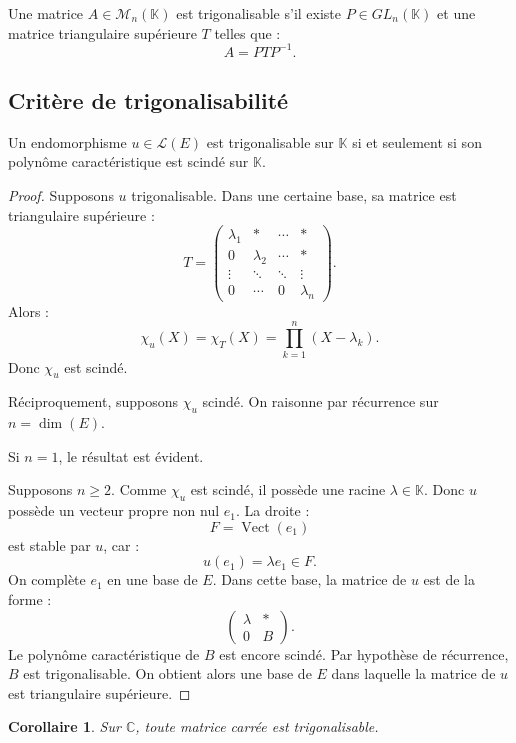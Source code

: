 \documentclass[11pt,a4paper]{article}
\newcommand{\K}{\mathbb K}
\newcommand{\C}{\mathbb C}
\newcommand{\M}{\mathcal M}
\newcommand{\Lcal}{\mathcal L}
\newcommand{\Vect}{\operatorname{Vect}}
\newtheorem{corollaire}[prop]{Corollaire}
\begin{document}
\begin{definitionbox}
Une matrice \(A\in\M_n(\K)\) est trigonalisable s'il existe \(P\in GL_n(\K)\) et une matrice triangulaire supérieure \(T\) telles que :
\[
A=PTP^{-1}.
\]
\end{definitionbox}

\subsection{Critère de trigonalisabilité}

\begin{theorembox}
Un endomorphisme \(u\in\Lcal(E)\) est trigonalisable sur \(\K\) si et seulement si son polynôme caractéristique est scindé sur \(\K\).
\end{theorembox}

\begin{proof}
Supposons \(u\) trigonalisable.  
Dans une certaine base, sa matrice est triangulaire supérieure :
\[
T=
\begin{pmatrix}
\lambda_1&*&\cdots&*\\
0&\lambda_2&\cdots&*\\
\vdots&\ddots&\ddots&\vdots\\
0&\cdots&0&\lambda_n
\end{pmatrix}.
\]
Alors :
\[
\chi_u(X)=\chi_T(X)=\prod_{k=1}^n(X-\lambda_k).
\]
Donc \(\chi_u\) est scindé.

Réciproquement, supposons \(\chi_u\) scindé.  
On raisonne par récurrence sur \(n=\dim(E)\).

Si \(n=1\), le résultat est évident.

Supposons \(n\geq2\).  
Comme \(\chi_u\) est scindé, il possède une racine \(\lambda\in\K\).  
Donc \(u\) possède un vecteur propre non nul \(e_1\).  
La droite :
\[
F=\Vect(e_1)
\]
est stable par \(u\), car :
\[
u(e_1)=\lambda e_1\in F.
\]
On complète \(e_1\) en une base de \(E\).  
Dans cette base, la matrice de \(u\) est de la forme :
\[
\begin{pmatrix}
\lambda&*\\
0&B
\end{pmatrix}.
\]
Le polynôme caractéristique de \(B\) est encore scindé.  
Par hypothèse de récurrence, \(B\) est trigonalisable.  
On obtient alors une base de \(E\) dans laquelle la matrice de \(u\) est triangulaire supérieure.
\end{proof}

\begin{corollaire}
Sur \(\C\), toute matrice carrée est trigonalisable.
\end{corollaire}
\end{document}

